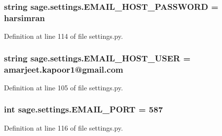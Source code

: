 \subsubsection[{E\+M\+A\+I\+L\+\_\+\+H\+O\+S\+T\+\_\+\+P\+A\+S\+S\+W\+O\+R\+D}]{\setlength{\rightskip}{0pt plus 5cm}string sage.\+settings.\+E\+M\+A\+I\+L\+\_\+\+H\+O\+S\+T\+\_\+\+P\+A\+S\+S\+W\+O\+R\+D = \textquotesingle{}harsimran\textquotesingle{}}\label{namespacesage_1_1settings_a66e7a16ed6b0df5716a6579fcba949a6}


Definition at line 114 of file settings.\+py.

\hypertarget{namespacesage_1_1settings_a9c01855359753a3c3f517341806347c2}{}
\subsubsection[{E\+M\+A\+I\+L\+\_\+\+H\+O\+S\+T\+\_\+\+U\+S\+E\+R}]{\setlength{\rightskip}{0pt plus 5cm}string sage.\+settings.\+E\+M\+A\+I\+L\+\_\+\+H\+O\+S\+T\+\_\+\+U\+S\+E\+R = \textquotesingle{}amarjeet.\+kapoor1@gmail.\+com\textquotesingle{}}\label{namespacesage_1_1settings_a9c01855359753a3c3f517341806347c2}


Definition at line 105 of file settings.\+py.

\hypertarget{namespacesage_1_1settings_a3fe927460bba6408b5df39fa8a10d367}{}
\subsubsection[{E\+M\+A\+I\+L\+\_\+\+P\+O\+R\+T}]{\setlength{\rightskip}{0pt plus 5cm}int sage.\+settings.\+E\+M\+A\+I\+L\+\_\+\+P\+O\+R\+T = 587}\label{namespacesage_1_1settings_a3fe927460bba6408b5df39fa8a10d367}


Definition at line 116 of file settings.\+py.

\hypertarget{namespacesage_1_1settings_a0fe7c4174cb1b7d03f7b574ae1e5eed9}{}
